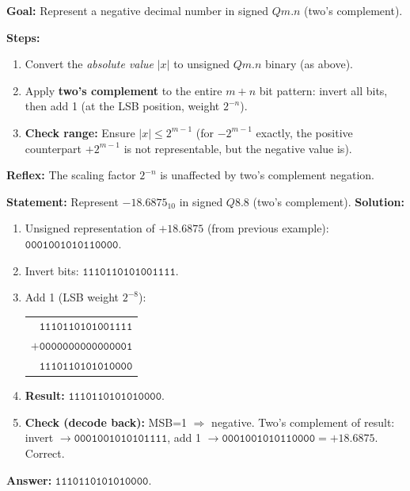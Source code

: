 \documentclass[11pt]{article}
\begin{document}
\begin{methode}
\textbf{Goal:} Represent a negative decimal number in signed $Qm.n$ (two's complement).\par
\textbf{Steps:}
\begin{enumerate}
    \item Convert the \emph{absolute value} $|x|$ to unsigned $Qm.n$ binary (as above).
    \item Apply \textbf{two's complement} to the entire $m+n$ bit pattern: invert all bits, then add 1 (at the LSB position, weight $2^{-n}$).
    \item \textbf{Check range:} Ensure $|x| \le 2^{m-1}$ (for $-2^{m-1}$ exactly, the positive counterpart $+2^{m-1}$ is not representable, but the negative value is).
\end{enumerate}
\textbf{Reflex:} The scaling factor $2^{-n}$ is unaffected by two's complement negation.
\end{methode}

\begin{exoresolu}
\textbf{Statement:} Represent $-18.6875_{10}$ in signed $Q8.8$ (two's complement).
\tcblower
\textbf{Solution:}
\begin{enumerate}
    \item Unsigned representation of $+18.6875$ (from previous example): $\mathtt{0001001010110000}$.
    \item Invert bits: $\mathtt{1110110101001111}$.
    \item Add 1 (LSB weight $2^{-8}$):
        \begin{center}
            \begin{tabular}{r}
                $\mathtt{1110110101001111}$ \\
                $+\mathtt{0000000000000001}$ \\ \hline
                $\mathtt{1110110101010000}$
            \end{tabular}
        \end{center}
    \item \textbf{Result:} $\mathtt{1110110101010000}$.
    \item \textbf{Check (decode back):} MSB=1 $\Rightarrow$ negative. Two's complement of result: invert $\to \mathtt{0001001010101111}$, add 1 $\to \mathtt{0001001010110000} = +18.6875$. Correct.
\end{enumerate}
\textbf{Answer:} $\mathtt{1110110101010000}$.
\end{exoresolu}
\end{document}
